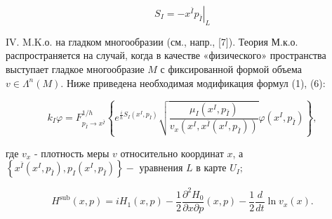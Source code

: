 \documentclass[10pt]{article}
\begin{document}
\[

S_{I}=-\left.x^{\bar{I}} p_{\bar{I}}\right|_{L}

\]



IV. M.K.о. на гладком многообразии (см., напр., [7]). Теория М.к.о. распространяется на случай, когда в качестве «физического» пространства выступает гладкое многообразие $M$ с фиксированной формой объема $v \in \Lambda^{n}(M)$. Ниже приведена необходимая модификация формул (1), (6):



\[

k_{I} \varphi=F_{p_{\bar{I}} \rightarrow x^{\bar{I}}}^{1 / h}\left\{e^{\frac{i}{h} S_{I}\left(x^{I}, p_{\bar{I}}\right)} \sqrt{\frac{\mu_{I}\left(x^{I}, p_{\bar{I}}\right)}{v_{x}\left(x^{I}, x^{\bar{I}}\left(x^{I}, p_{\bar{I}}\right)\right)}} \varphi\left(x^{I}, p_{\bar{I}}\right)\right\},

\]



где $v_{x}$ - плотность меры $v$ относительно координат $x$, а $\left\{x^{\bar{I}}\left(x^{I}, p_{\bar{I}}\right), p_{I}\left(x^{I}, p_{\bar{I}}\right)\right\}-$ уравнения $L$ в карте $U_{I} ;$



\[

H^{\mathrm{sub}}(x, p)=i H_{1}(x, p)-\frac{1}{2} \frac{\partial^{2} H_{0}}{\partial x \partial p}(x, p)-\frac{1}{2} \frac{d}{d t} \ln v_{x}(x) .

\]
\end{document}
